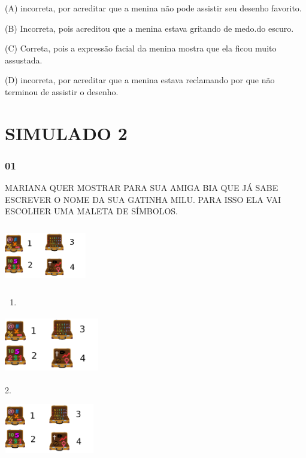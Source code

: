 (A) incorreta, por acreditar que a menina não pode assistir seu desenho
favorito.

(B) Incorreta, pois acreditou que a menina estava gritando de medo.do
escuro.

(C) Correta, pois a expressão facial da menina mostra que ela ficou
muito assustada.

(D) incorreta, por acreditar que a menina estava reclamando por que não
terminou de assistir o desenho.

\section{SIMULADO 2}\label{simulado-2}

\subsubsection{01}\label{section-41}

MARIANA QUER MOSTRAR PARA SUA AMIGA BIA QUE JÁ SABE ESCREVER O NOME DA
SUA GATINHA MILU. PARA ISSO ELA VAI ESCOLHER UMA MALETA DE SÍMBOLOS.

\includegraphics[width=1.40208in,height=1.03194in]{media/image209.png}

\begin{enumerate}
\def\labelenumi{\arabic{enumi}.}
\item
\end{enumerate}

\includegraphics[width=1.62986in,height=0.98819in]{media/image209.png}

2.

\includegraphics[width=1.55139in,height=0.85000in]{media/image209.png}

